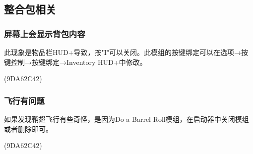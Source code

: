 \documentclass[UTF8,a4paper]{article}
\begin{document}
		\subsection{整合包相关}
			\subsubsection{屏幕上会显示背包内容}
				\par 此现象是物品栏HUD+导致，按"I"可以关闭。此模组的按键绑定可以在选项→按键控制→按键绑定→Inventory HUD+中修改。
				\begin{flushright}(9DA62C42)\end{flushright}
			\subsubsection{飞行有问题}
				\par 如果发现鞘翅飞行有些奇怪，是因为Do a Barrel Roll模组，在启动器中关闭模组或者删除即可。
				\begin{flushright}(9DA62C42)\end{flushright}
\end{document}
